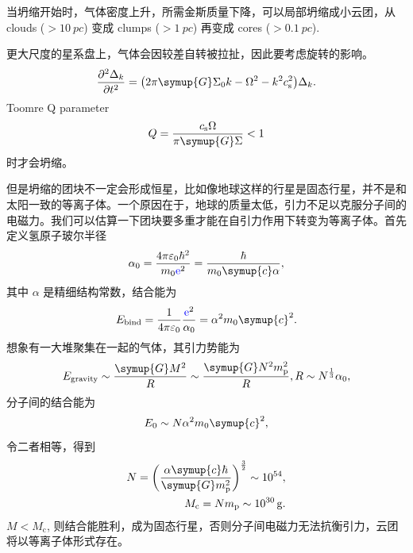 \documentclass[../天体物理基础.tex]{subfiles}
\begin{document}
当坍缩开始时，气体密度上升，所需金斯质量下降，可以局部坍缩成小云团，从 clouds ($>\qty{10}{pc}$) 变成 clumps ($>\qty{1}{pc}$) 再变成 cores ($>\qty{0.1}{pc}$).

更大尺度的星系盘上，气体会因较差自转被拉扯，因此要考虑旋转的影响。
\begin{equation}
\frac{\partial{}^{2}\Delta_{k}}{\partial{}t^{2}}=\mleft(2\pi\symup{G}\Sigma_{0}k-\Omega^{2}-k^{2}c_{\mathrm{s}}^{2}\mright)\Delta_{k}.
\end{equation}
Toomre Q parameter
\begin{equation}
Q=\frac{c_{\mathrm{s}}\Omega}{\pi\symup{G}\Sigma}<1
\end{equation}
时才会坍缩。

但是坍缩的团块不一定会形成恒星，比如像地球这样的行星是固态行星，并不是和太阳一致的等离子体。一个原因在于，地球的质量太低，引力不足以克服分子间的电磁力。我们可以估算一下团块要多重才能在自引力作用下转变为等离子体。首先定义氢原子玻尔半径
\begin{equation}
\alpha_{0}=\frac{4\pi\varepsilon_{0}\hbar^{2}}{m_{0}{\color{blue}{\ce{e}}}^{2}}=\frac{\hbar}{m_{0}\symup{c}\alpha},
\end{equation}
其中 $\alpha$ 是精细结构常数，结合能为
\begin{equation}
E_{\mathrm{bind}}=\frac{1}{4\pi\varepsilon_{0}}\frac{{\color{blue}{\ce{e}}}^{2}}{\alpha_{0}}=\alpha^{2}m_{0}\symup{c}^{2}.
\end{equation}
想象有一大堆聚集在一起的气体，其引力势能为
\begin{equation}
E_{\mathrm{gravity}}\sim\frac{\symup{G}M^{2}}{R}\sim\frac{\symup{G}N^{2}m_{\ce{p}}^{2}}{R}, R\sim N^{\frac{1}{3}}\alpha_{0},
\end{equation}
分子间的结合能为
\begin{equation}
E_{0}\sim N\alpha^{2}m_{0}\symup{c}^{2},
\end{equation}
令二者相等，得到
\begin{align}
N=\mleft(\frac{\alpha\symup{c}\hbar}{\symup{G}m_{\ce{p}}^{2}}\mright)^{\frac{3}{2}}\sim10^{54},\\
M_{\mathrm{c}}=Nm_{\ce{p}}\sim\qty{e30}{g}.
\end{align}
$M<M_{\mathrm{c}}$, 则结合能胜利，成为固态行星，否则分子间电磁力无法抗衡引力，云团将以等离子体形式存在。
\end{document}
